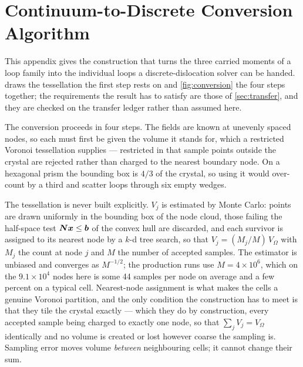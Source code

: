 \section{Continuum-to-Discrete Conversion Algorithm}
\label{app:conversion}

This appendix gives the construction that turns the three carried moments of a
loop family into the individual loops a discrete-dislocation solver can be
handed.  draws the tessellation the first step rests on and
\cref{fig:conversion} the four steps together; the requirements the result has
to satisfy are those of \cref{sec:transfer}, and they are checked on the
transfer ledger rather than assumed here.

The conversion proceeds in four steps. The fields are known at unevenly spaced
nodes, so each must first be given the volume it stands for, which a restricted
Voronoi tessellation supplies --- restricted in that sample points outside the
crystal are rejected rather than charged to the nearest boundary node. On a hexagonal prism the bounding box is $4/3$ of the crystal, so
using it would over-count by a third and scatter loops through six empty wedges.

The tessellation is never built explicitly. $V_j$ is estimated by Monte Carlo:
points are drawn uniformly in the bounding box of the node cloud, those failing
the half-space test $\bm{N}\bm{x}\le\bm{b}$ of the convex hull are discarded, and each
survivor is assigned to its nearest node by a $k$-d tree search, so that
$V_j=(M_j/M)\,V_\Omega$ with $M_j$ the count at node $j$ and $M$ the number of
accepted samples. The estimator is unbiased and converges as $M^{-1/2}$; the
production runs use $M=4\times10^{6}$, which on the $9.1\times10^{4}$ nodes here
is some 44 samples per node on average and a few percent on a typical cell.
Nearest-node assignment is what makes the cells a genuine Voronoi partition,
and the only condition the construction has to meet is that they tile the
crystal exactly --- which they do by construction, every accepted sample being
charged to exactly one node, so that $\sum_j V_j=V_\Omega$ identically and no
volume is created or lost however coarse the sampling is. Sampling error moves
volume \emph{between} neighbouring cells; it cannot change their sum.

